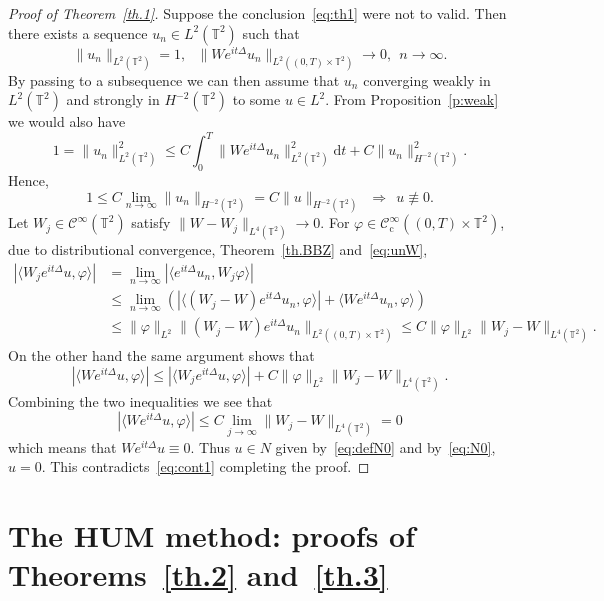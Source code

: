\documentclass[10pt]{amsart}
\theoremstyle{definition}\newtheorem{defi}[theo]{Definition}\newtheorem{rema}[theo]{Remark}\newtheorem{exam}[theo]{Example}\newtheorem{exem}[theo]{Example}\newtheorem{nota}[theo]{Notation}
\newcommand{\CI}{{\mathcal C}^\infty }
\newcommand{\CIc}{{\mathcal C}^\infty_{\mathrm{c}} }
\newcommand{\TT}{{\mathbb T}}
\newcommand*{\dd}{\mathrm{d}}
\newcommand*{\dt}{\dd t}
\begin{document}
\begin{proof}[Proof of Theorem~\ref{th.1}]
Suppose the conclusion~\eqref{eq:th1} were not to valid. Then there exists a sequence $ u_n \in L^2 (\TT^2) $ such that
\begin{equation}\label{eq:unW}
\| u_n \|_{ L^2 (\TT^2) } = 1, \ \ \
\| W e^{it \Delta } u_n \|_{ L^2 ((0, T) \times \TT^2) }\to 0, \ \ n
\to \infty.
\end{equation}
By passing to a subsequence we can then assume that $ u_n $ converging weakly in $ L^2 (\TT^2) $ and strongly in $ H^{-2} (\TT^2) $ to some $ u \in L^2 $. From Proposition~\ref{p:weak} we would also have
\[
1 = \| u_n \|_{ L^2 (\TT^2) }^2 \leq C
\int_0^T \| W e^{it \Delta } u_n \|_{ L^2 (\TT^2) }^2 \dt + C \| u_n \|^2_ {H^{-2} (\TT^2) }.
\]
Hence,
\begin{equation}\label{eq:cont1}
1 \leq C \lim_{n \to \infty } \| u_n \|_{H^{-2} (\TT^2) } = C\| u \|_{ H^{-2} (\TT^2) }
\ \ \Longrightarrow \ \ u \not \equiv 0.
\end{equation}
Let $ W_j \in \CI (\TT^2) $ satisfy $ \| W - W_j \|_{L^4 (\TT^2) }
\to 0 $. For $ \varphi \in \CIc ((0, T) \times \TT^2) $, due to distributional convergence, Theorem~\ref{th.BBZ} and~\eqref{eq:unW},
\[
\begin{split} |\langle W_j e^{ it\Delta } u, \varphi \rangle| & = \lim_{ n \to \infty }
|\langle e^{ it \Delta } u_n, W_j \varphi \rangle| \\
&\leq
\lim_{ n \to \infty }
\left(| \langle (W_j - W) e^{ i t \Delta } u_n, \varphi \rangle | +
\langle W e^{ it \Delta } u_n, \varphi \rangle \right) \\ & \leq
\|\varphi \|_{ L^2 } \| (W_j - W) e^{it \Delta } u_n \|_{L^2 ((0, T) \times
\TT^2) }
\leq C\|\varphi \|_{L^2 } \| W_j - W \|_{L^4(\TT^2) }.
\end{split}
\]
On the other hand the same argument shows that
\[
| \langle W e^{it \Delta }u, \varphi \rangle | \leq | \langle W_j e^{ it \Delta } u, \varphi \rangle | + C \| \varphi\|_{L^2} \| W_j - W \|_{L^4(\TT^2) }.
\]
Combining the two inequalities we see that 
\[
|\langle W e^{it \Delta }u, \varphi \rangle | \leq C
\lim_{ j \to \infty } \| W_j - W \|_{L^4(\TT^2) } = 0
\]
which means that $ W e^{ it \Delta } u \equiv 0 $. Thus $ u \in N $ given by~\eqref{eq:defN0} and by~\eqref{eq:N0}, $ u = 0 $. This contradicts~\eqref{eq:cont1} completing the proof.
\end{proof}


\section{The HUM method: proofs of Theorems~\ref{th.2} and~\ref{th.3}}\label{HUM}
\end{document}
